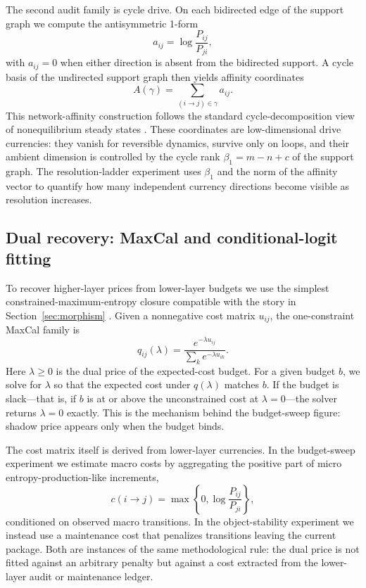 \documentclass[11pt,a4paper]{article}
\newcommand{\betaone}{\beta_1}
\begin{document}
The second audit family is cycle drive. On each bidirected edge of the support graph we compute the antisymmetric 1-form
\[
a_{ij}=\log\frac{P_{ij}}{P_{ji}},
\]
with \(a_{ij}=0\) when either direction is absent from the bidirected support. A cycle basis of the undirected support graph then yields affinity coordinates
\[
A(\gamma)=\sum_{(i\to j)\in \gamma} a_{ij}.
\]
This network-affinity construction follows the standard cycle-decomposition view of nonequilibrium steady states \cite{schnakenberg1976network,esposito2010threefaces}.
These coordinates are low-dimensional drive currencies: they vanish for reversible dynamics, survive only on loops, and their ambient dimension is controlled by the cycle rank \(\betaone = m-n+c\) of the support graph. The resolution-ladder experiment uses \(\betaone\) and the norm of the affinity vector to quantify how many independent currency directions become visible as resolution increases.

\subsection{Dual recovery: MaxCal and conditional-logit fitting}

To recover higher-layer prices from lower-layer budgets we use the simplest constrained-maximum-entropy closure compatible with the story in Section~\ref{sec:morphism} \cite{jaynes1957information,presse2013maxent}. Given a nonnegative cost matrix \(u_{ij}\), the one-constraint MaxCal family is
\[
q_{ij}(\lambda)=\frac{e^{-\lambda u_{ij}}}{\sum_k e^{-\lambda u_{ik}}}.
\]
Here \(\lambda\ge 0\) is the dual price of the expected-cost budget. For a given budget \(b\), we solve for \(\lambda\) so that the expected cost under \(q(\lambda)\) matches \(b\). If the budget is slack---that is, if \(b\) is at or above the unconstrained cost at \(\lambda=0\)---the solver returns \(\lambda=0\) exactly. This is the mechanism behind the budget-sweep figure: shadow price appears only when the budget binds.

The cost matrix itself is derived from lower-layer currencies. In the budget-sweep experiment we estimate macro costs by aggregating the positive part of micro entropy-production-like increments,
\[
c(i\to j)=\max\left\{0,\log\frac{P_{ij}}{P_{ji}}\right\},
\]
conditioned on observed macro transitions. In the object-stability experiment we instead use a maintenance cost that penalizes transitions leaving the current package. Both are instances of the same methodological rule: the dual price is not fitted against an arbitrary penalty but against a cost extracted from the lower-layer audit or maintenance ledger.
\end{document}
